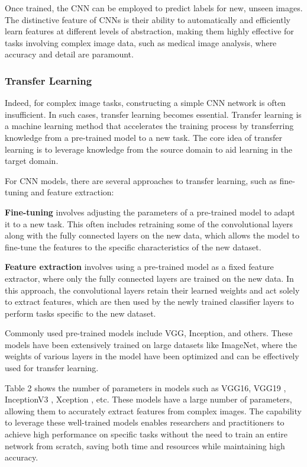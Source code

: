 Once trained, the CNN can be employed to predict labels for new, unseen images. The distinctive feature of CNNs is their ability to automatically and efficiently learn features at different levels of abstraction, making them highly effective for tasks involving complex image data, such as medical image analysis, where accuracy and detail are paramount.

\subsubsection{Transfer Learning}

Indeed, for complex image tasks, constructing a simple CNN network is often insufficient. In such cases, transfer learning becomes essential. Transfer learning is a machine learning method that accelerates the training process by transferring knowledge from a pre-trained model to a new task. The core idea of transfer learning is to leverage knowledge from the source domain to aid learning in the target domain.

For CNN models, there are several approaches to transfer learning, such as fine-tuning and feature extraction: 

\textbf{Fine-tuning} involves adjusting the parameters of a pre-trained model to adapt it to a new task. This often includes retraining some of the convolutional layers along with the fully connected layers on the new data, which allows the model to fine-tune the features to the specific characteristics of the new dataset. 

\textbf{Feature extraction} involves using a pre-trained model as a fixed feature extractor, where only the fully connected layers are trained on the new data. In this approach, the convolutional layers retain their learned weights and act solely to extract features, which are then used by the newly trained classifier layers to perform tasks specific to the new dataset.

Commonly used pre-trained models include VGG, Inception, and others. These models have been extensively trained on large datasets like ImageNet, where the weights of various layers in the model have been optimized and can be effectively used for transfer learning.

Table 2 shows the number of parameters in models such as VGG16, VGG19 \cite{3.5}, InceptionV3 \cite{3.6}, Xception \cite{3.7}, etc. These models have a large number of parameters, allowing them to accurately extract features from complex images. The capability to leverage these well-trained models enables researchers and practitioners to achieve high performance on specific tasks without the need to train an entire network from scratch, saving both time and resources while maintaining high accuracy.

